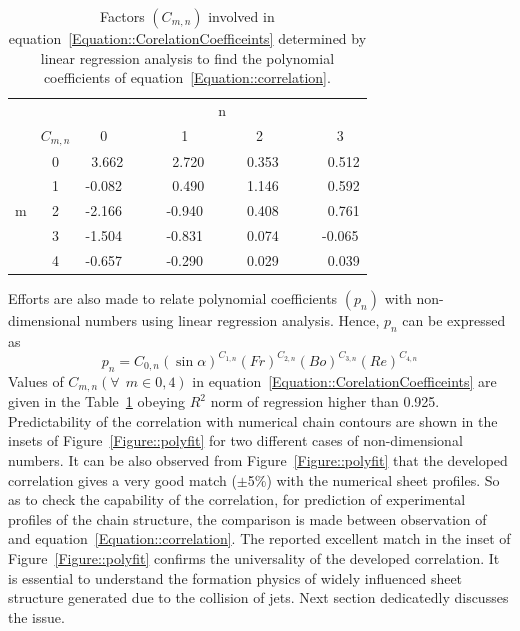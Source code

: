\begin{table}
    \centering
    \caption{Factors $\left(C_{m,n}\right)$ involved in equation~\ref{Equation::CorelationCoefficeints} determined by linear regression analysis to find the polynomial coefficients of equation~\ref{Equation::correlation}.}
    \label{Table::polyfit}
    \begin{tabular}{@{}cc|ccccccccc@{}}
        &   &     &   & & &n &      &    &   &        \\
        & $C_{m,n}$  & 0 &   &  & 1 &      & 2 & &   & 3      \\\hline
        & 0 & ~3.662&  & & ~2.720&  & ~0.353& & & ~0.512  \\
        & 1  & -0.082 &&  & ~0.490  & & ~1.146& & & ~0.592  \\
        m& 2 & -2.166 & & & -0.940& & ~0.408& & & ~0.761  \\
        & 3 & -1.504& & & -0.831& & ~0.074& & & -0.065 \\
        & 4 & -0.657& & & -0.290& & ~0.029&& & ~0.039  \\ 
    \end{tabular}
\end{table}
Efforts are also made to relate polynomial coefficients $\left(p_n\right)$ with non-dimensional numbers using linear regression analysis. Hence, $p_n$ can be expressed as
\begin{equation}\label{Equation::CorelationCoefficeints}
p_n = C_{0,n}\left(\sin\alpha\right)^{C_{1,n}}\left(Fr\right)^{C_{2,n}}\left(Bo\right)^{C_{3,n}}\left(Re\right)^{C_{4,n}}
\end{equation}
Values of $C_{m,n} \left(\forall\:\: m \in {0,4}\right)$ in equation~\ref{Equation::CorelationCoefficeints} are given in the Table~\ref{Table::polyfit} obeying $R^2$ norm of regression higher than 0.925. Predictability of the correlation with numerical chain contours are shown in the insets of Figure~\ref{Figure::polyfit} for two different cases of non-dimensional numbers. It can be also observed from Figure~\ref{Figure::polyfit} that the developed correlation gives a very good match ($\pm$5\%) with the numerical sheet profiles. So as to check the capability of the correlation, for prediction of experimental profiles of the chain structure, the comparison is made between observation of \citet{bush2004collision} and equation~\ref{Equation::correlation}. The reported excellent match in the inset of Figure~\ref{Figure::polyfit} confirms the universality of the developed correlation. It is essential to understand the formation physics of widely influenced sheet structure generated due to the collision of jets. Next section dedicatedly discusses the issue.
